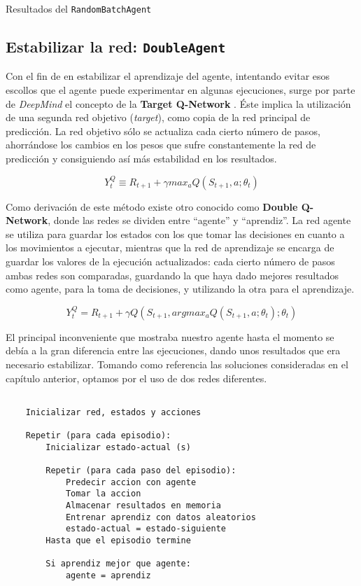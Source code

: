 %
       {Resultados del \texttt{RandomBatchAgent}}


\subsection{Estabilizar la red: \texttt{DoubleAgent}}
\label{sec:DA}

Con el fin de en estabilizar el aprendizaje del agente, intentando evitar esos escollos que el agente puede experimentar en algunas ejecuciones, surge por parte de \textit{DeepMind} el concepto de la \textbf{Target Q-Network} \citep{NIPS2010_3964}. Éste implica la utilización de una segunda red objetivo (\textit{target}), como copia de la red principal de predicción. La red objetivo sólo se actualiza cada cierto número de pasos, ahorrándose los cambios en los pesos que sufre constantemente la red de predicción y consiguiendo así más estabilidad en los resultados.

$$Y^Q_{t} \equiv R_{t+1} + \gamma max_{a} Q(S_{t+1}, a; \theta_{t})$$

Como derivación de este método existe otro conocido como \textbf{Double Q-Network}, donde las redes se dividen entre ``agente'' y ``aprendiz''. La red agente se utiliza para guardar los estados con los que tomar las decisiones en cuanto a los movimientos a ejecutar, mientras que la red de aprendizaje se encarga de guardar los valores de la ejecución actualizados: cada cierto número de pasos ambas redes son comparadas, guardando la que haya dado mejores resultados como agente, para la toma de decisiones, y utilizando la otra para el aprendizaje.

$$Y^Q_{t} = R_{t+1} + \gamma Q(S_{t+1}, argmax_{a} Q(S_{t+1}, a; \theta_{t}); \theta_{t})$$

El principal inconveniente que mostraba nuestro agente hasta el momento se debía a la gran diferencia entre las ejecuciones, dando unos resultados que era necesario estabilizar. Tomando como referencia las soluciones consideradas en el capítulo anterior, optamos por el uso de dos redes diferentes.

\begin{minipage}{0.9\linewidth}%
    \begin{lstlisting}[frame=tb, caption=Pseudocódigo DoubleAgent, inputencoding=latin1, label=code:cartpole_drl4]
    
    Inicializar red, estados y acciones
    
    Repetir (para cada episodio):
        Inicializar estado-actual (s)
        
        Repetir (para cada paso del episodio):
            Predecir accion con agente
            Tomar la accion
            Almacenar resultados en memoria
            Entrenar aprendiz con datos aleatorios
            estado-actual = estado-siguiente
        Hasta que el episodio termine

        Si aprendiz mejor que agente:
            agente = aprendiz
    \end{lstlisting}%
\end{minipage}

